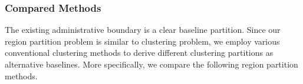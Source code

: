 \subsubsection{Compared Methods}

The existing administrative boundary is a clear baseline partition. Since our region partition problem is similar to clustering problem, we employ various conventional clustering methods to derive different clustering partitions as alternative baselines. More specifically, we compare the following region partition methods.



\begin{figure}[t!]
\centering
{}

\end{figure}
